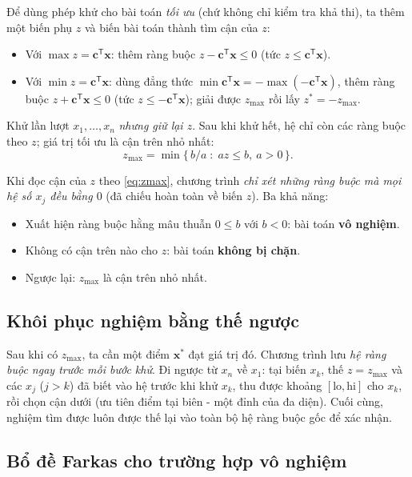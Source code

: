 \documentclass[12pt,a4paper]{article}
\theoremstyle{definition}
\newcommand{\vx}{\mathbf{x}}
\newcommand{\vc}{\mathbf{c}}
\newcommand{\T}{^{\mathsf T}}
\begin{document}
Để dùng phép khử cho bài toán \emph{tối ưu} (chứ không chỉ kiểm tra khả thi),
ta thêm một biến phụ $z$ và biến bài toán thành tìm cận của $z$:
\begin{itemize}
    \item Với $\max z = \vc\T\vx$: thêm ràng buộc $z - \vc\T\vx \le 0$
          (tức $z \le \vc\T\vx$).
    \item Với $\min z = \vc\T\vx$: dùng đẳng thức $\min \vc\T\vx = -\max(-\vc\T\vx)$,
          thêm ràng buộc $z + \vc\T\vx \le 0$ (tức $z \le -\vc\T\vx$); giải được
          $z_{\max}$ rồi lấy $z^\ast = -z_{\max}$.
\end{itemize}
Khử lần lượt $x_1, \ldots, x_n$ \emph{nhưng giữ lại $z$}. Sau khi khử hết, hệ
chỉ còn các ràng buộc theo $z$; giá trị tối ưu là cận trên nhỏ nhất:
\begin{equation}
    z_{\max} = \min\bigl\{\, b/a \;:\; a z \le b,\ a > 0 \,\bigr\}.
    \label{eq:zmax}
\end{equation}

\begin{infobox}
Khi đọc cận của $z$ theo \eqref{eq:zmax}, chương trình \emph{chỉ xét những ràng
buộc mà mọi hệ số $x_j$ đều bằng $0$} (đã chiếu hoàn toàn về biến $z$). Ba khả
năng:
\begin{itemize}
    \item Xuất hiện ràng buộc hằng mâu thuẫn $0 \le b$ với $b < 0$:
          bài toán \textbf{vô nghiệm}.
    \item Không có cận trên nào cho $z$: bài toán \textbf{không bị chặn}.
    \item Ngược lại: $z_{\max}$ là cận trên nhỏ nhất.
\end{itemize}
\end{infobox}

\subsection{Khôi phục nghiệm bằng thế ngược}

Sau khi có $z_{\max}$, ta cần một điểm $\vx^\ast$ đạt giá trị đó. Chương trình
lưu \emph{hệ ràng buộc ngay trước mỗi bước khử}. Đi ngược từ $x_n$ về
$x_1$: tại biến $x_k$, thế $z = z_{\max}$ và các $x_j$ ($j > k$) đã biết vào hệ
trước khi khử $x_k$, thu được khoảng $[\text{lo}, \text{hi}]$ cho $x_k$, rồi
chọn cận dưới (ưu tiên điểm tại biên - một đỉnh của đa diện). Cuối cùng,
nghiệm tìm được luôn được thế lại vào toàn bộ hệ ràng buộc gốc để xác nhận.

\subsection{Bổ đề Farkas cho trường hợp vô nghiệm}
\label{sec:farkas}
\end{document}
